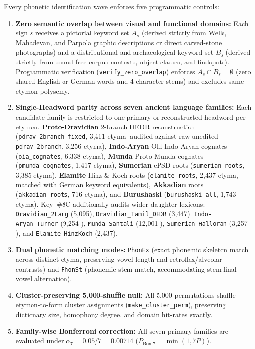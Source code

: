 \documentclass[11pt,a4paper]{article}
\begin{document}
Every phonetic identification wave enforces five programmatic controls:
\begin{enumerate}
  \item \textbf{Zero semantic overlap between visual and functional domains:} Each sign $s$ receives a pictorial keyword set $A_s$ (derived strictly from Wells, Mahadevan, and Parpola graphic descriptions or direct carved-stone photographs) and a distributional and archaeological keyword set $B_s$ (derived strictly from sound-free corpus contexts, object classes, and findspots). Programmatic verification (\texttt{verify\_zero\_overlap}) enforces $A_s \cap B_s = \emptyset$ (zero shared English or German words and 4-character stems) and excludes same-etymon polysemy.
  \item \textbf{Single-Headword parity across seven ancient language families:} Each candidate family is restricted to one primary or reconstructed headword per etymon: \textbf{Proto-Dravidian} 2-branch DEDR reconstruction \citep{burrow1984dedr,krishnamurti2003} (\texttt{pdrav\_2branch\_fixed}, 3,411 etyma; audited against raw unedited \texttt{pdrav\_2branch}, 3,256 etyma), \textbf{Indo-Aryan} Old Indo-Aryan cognates \citep{monierwilliams1899,turner1966cdial} (\texttt{oia\_cognates}, 6,338 etyma), \textbf{Munda} Proto-Munda cognates \citep{pinnow1959,sidwell2015} (\texttt{pmunda\_cognates}, 1,417 etyma), \textbf{Sumerian} ePSD roots (\texttt{sumerian\_roots}, 3,385 etyma), \textbf{Elamite} Hinz \& Koch roots \citep{hinz1987elam} (\texttt{elamite\_roots}, 2,437 etyma, matched with German keyword equivalents), \textbf{Akkadian} roots (\texttt{akkadian\_roots}, 716 etyma), and \textbf{Burushaski} \citep{berger1998} (\texttt{burushaski\_all}, 1,743 etyma). Key~\#8C additionally audits wider daughter lexicons: \texttt{Dravidian\_2Lang} (5,095), \texttt{Dravidian\_Tamil\_DEDR} (3,447), \texttt{Indo-Aryan\_Turner} (9,254 \citep{turner1966cdial}), \texttt{Munda\_Santali} (12,001 \citep{campbell1899santali}), \texttt{Sumerian\_Halloran} (3,257 \citep{halloran2006}), and \texttt{Elamite\_HinzKoch} (2,437).
  \item \textbf{Dual phonetic matching modes:} \texttt{PhonEx} (exact phonemic skeleton match across distinct etyma, preserving vowel length and retroflex/alveolar contrasts) and \texttt{PhonSt} (phonemic stem match, accommodating stem-final vowel alternation).
  \item \textbf{Cluster-preserving 5,000-shuffle null:} All 5,000 permutations shuffle etymon-to-form cluster assignments (\texttt{make\_cluster\_perm}), preserving dictionary size, homophony degree, and domain hit-rates exactly.
  \item \textbf{Family-wise Bonferroni correction:} All seven primary families are evaluated under $\alpha_7 = 0.05/7 = 0.00714$ ($P_{\text{Bonf7}} = \min(1, 7P)$).
\end{enumerate}
\end{document}
